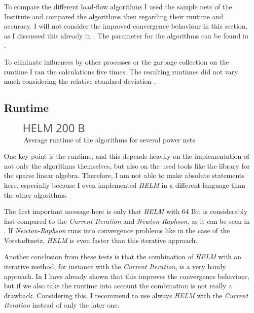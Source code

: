 To compare the different load-flow algorithms I used the sample nets of the Institute and compared the algorithms then regarding their runtime and accuracy. I will not consider the improved convergence behaviour in this section, as I discussed this already in . The parameter for the algorithms can be found in .

To eliminate influences by other processes or the garbage collection on the runtime I ran the calculations five times. The resulting runtimes did not vary much considering the relative standard deviation .

\subsection{Runtime}

\begin{figure}
	\centering
	\includegraphics[scale=0.7]{figures/comparison_runtime}
	\caption[Comparison, average runtime]{Average runtime of the algorithms for several power nets}
	\label{fig:comparison_runtime}
\end{figure}

One key point is the runtime, and this depends heavily on the implementation of not only the algorithms themselves, but also on the used tools like the library for the sparse linear algebra. Therefore, I am not able to make absolute statements here, especially because I even implemented \emph{HELM} in a different language than the other algorithms. 

The first important message here is only that \emph{HELM} with 64 Bit is considerably fast compared to the \emph{Current Iteration} and \emph{Newton-Raphson}, as it can be seen in . If \emph{Newton-Raphson} runs into convergence problems like in the case of the Vorstadtnetz, \emph{HELM} is even faster than this iterative approach. 

Another conclusion from these tests is that the combination of \emph{HELM} with an iterative method, for instance with the \emph{Current Iteration}, is a very handy approach. In  I have already shown that this improves the convergence behaviour, but if we also take the runtime into account the combination is not really a drawback. Considering this, I recommend to use always \emph{HELM} with the \emph{Current Iteration} instead of only the later one.


